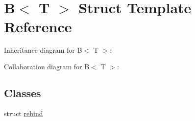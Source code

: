 \hypertarget{struct_b}{}\section{B$<$ T $>$ Struct Template Reference}
\label{struct_b}


Inheritance diagram for B$<$ T $>$\+:


Collaboration diagram for B$<$ T $>$\+:
\subsection*{Classes}
\begin{DoxyCompactItemize}
\item 
struct \mbox{\hyperlink{struct_b_1_1rebind}{rebind}}
\end{DoxyCompactItemize}
